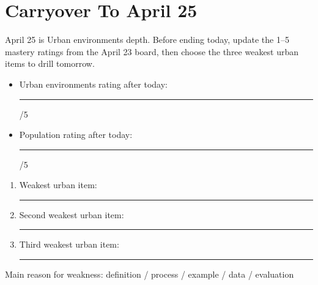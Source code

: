 \documentclass[11pt,a4paper]{article}
\begin{document}
\section{Carryover To April 25}

April 25 is Urban environments depth. Before ending today, update the 1--5
mastery ratings from the April 23 board, then choose the three weakest urban
items to drill tomorrow.

\begin{itemize}
  \item Urban environments rating after today: \rule{0.12\textwidth}{0.4pt} /5
  \item Population rating after today: \rule{0.12\textwidth}{0.4pt} /5
\end{itemize}

\begin{enumerate}
  \item Weakest urban item: \rule{0.72\textwidth}{0.4pt}
  \item Second weakest urban item: \rule{0.66\textwidth}{0.4pt}
  \item Third weakest urban item: \rule{0.68\textwidth}{0.4pt}
\end{enumerate}

\vspace{0.5em}

\noindent Main reason for weakness:
\quad definition \quad / \quad process \quad / \quad example \quad / \quad data
\quad / \quad evaluation
\end{document}
